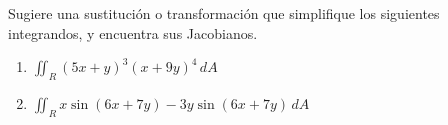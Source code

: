  Sugiere una sustitución o transformación que simplifique los siguientes integrandos, y encuentra sus Jacobianos.

\begin{enumerate}
    \item $\iint_R (5x + y)^3 (x + 9y)^4 \, dA$
    \item $\iint_R x \sin(6x + 7y) - 3y \sin(6x + 7y) \, dA$
\end{enumerate}
